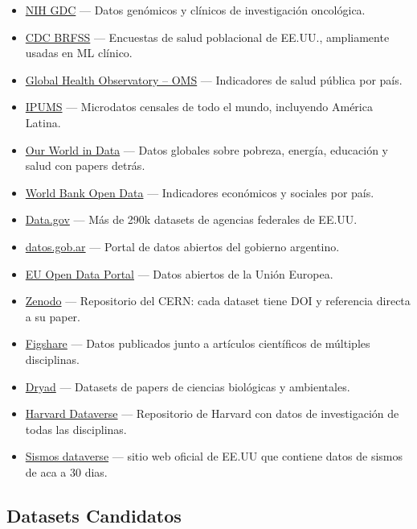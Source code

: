 \documentclass{article}
\begin{document}
\begin{itemize}
    \item \href{https://gdc.cancer.gov/}{NIH GDC} — Datos genómicos y clínicos de investigación oncológica.
    \item \href{https://www.cdc.gov/brfss/}{CDC BRFSS} — Encuestas de salud poblacional de EE.UU., ampliamente usadas en ML clínico.
    \item \href{https://www.who.int/data/gho}{Global Health Observatory – OMS} — Indicadores de salud pública por país.
    \item \href{https://ipums.org/}{IPUMS} — Microdatos censales de todo el mundo, incluyendo América Latina.
    \item \href{https://ourworldindata.org/}{Our World in Data} — Datos globales sobre pobreza, energía, educación y salud con papers detrás.
    \item \href{https://data.worldbank.org/}{World Bank Open Data} — Indicadores económicos y sociales por país.
    \item \href{https://data.gov/}{Data.gov} — Más de 290k datasets de agencias federales de EE.UU.
    \item \href{https://datos.gob.ar/}{datos.gob.ar} — Portal de datos abiertos del gobierno argentino.
    \item \href{https://data.europa.eu/}{EU Open Data Portal} — Datos abiertos de la Unión Europea.
    \item \href{https://zenodo.org/}{Zenodo} — Repositorio del CERN: cada dataset tiene DOI y referencia directa a su paper.
    \item \href{https://figshare.com/}{Figshare} — Datos publicados junto a artículos científicos de múltiples disciplinas.
    \item \href{https://datadryad.org/}{Dryad} — Datasets de papers de ciencias biológicas y ambientales.
    \item \href{https://dataverse.harvard.edu/}{Harvard Dataverse} — Repositorio de Harvard con datos de investigación de todas las disciplinas.
    \item \href{https://www.usgs.gov/programs/earthquake-hazards/lists-maps-and-statistics}{Sismos dataverse} — sitio web oficial de EE.UU que contiene datos de sismos de aca a 30 dias.
\end{itemize}

\newpage

\subsection{Datasets Candidatos}
\end{document}

